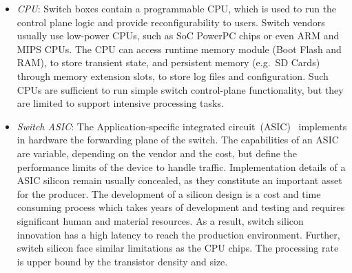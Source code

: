\begin{itemize}
  \item \emph{CPU}: Switch boxes contain a programmable CPU, which is used to
        run the control plane logic and provide reconfigurability to users.
        Switch vendors usually use low-power CPUs, such as SoC PowerPC chips or
        even ARM and MIPS CPUs. The CPU can access runtime memory
        module (Boot Flash and RAM), to store transient state, and persistent
        memory (e.g.~SD Cards) through memory extension slots, to store log
        files and configuration. Such CPUs are sufficient to run simple switch
        control-plane functionality, but they are limited to support
        intensive processing tasks. 
  \item \emph{Switch ASIC}: The Application-specific integrated
        circuit~(ASIC)~\cite{hp-asic,broadcom-asic,intel-asic} implements in
        hardware the forwarding plane of the switch.  The capabilities of an
        ASIC are variable, depending on the vendor and the cost, but define the
        performance limits of the device to handle traffic. Implementation
        details of a ASIC silicon remain usually concealed, as they constitute an
        important asset for the producer.  The development of a silicon
        design is a cost and time consuming process which takes years of development and testing
        and requires significant human and material resources. As a result, 
        switch silicon innovation has a high latency to reach the production
        environment. Further, switch silicon face similar limitations as the CPU
        chips. The processing rate is upper bound by the transistor
        density and size. 


\end{itemize}
